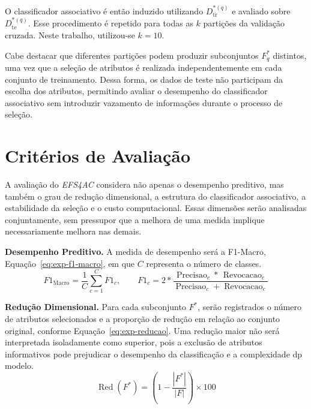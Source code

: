O classificador associativo é então induzido utilizando
$D_{\mathrm{tr}}^{*(q)}$ e avaliado sobre
$D_{\mathrm{te}}^{*(q)}$. Esse procedimento é repetido para
todas as $k$ partições da validação cruzada. Neste trabalho, utilizou-se $k=10$.

Cabe destacar que diferentes partições podem produzir subconjuntos
$F_q^{*}$ distintos, uma vez que a seleção de atributos é realizada
independentemente em cada conjunto de treinamento. Dessa forma,
os dados de teste não participam da escolha dos atributos, permitindo
avaliar o desempenho do classificador associativo sem introduzir
vazamento de informações durante o processo de seleção.

\section{Critérios de Avaliação}
\label{sec:exp-criterios}

A avaliação do \textit{EFS4AC} considera não apenas o desempenho preditivo,
mas também o grau de redução dimensional, a estrutura do classificador
associativo, a estabilidade da seleção e o custo computacional. Essas dimensões
serão analisadas conjuntamente, sem pressupor que a melhora de uma medida
implique necessariamente melhora nas demais.

\textbf{Desempenho Preditivo.} A medida de desempenho será a F1-Macro, Equação~\ref{eq:exp-f1-macro}, em que $C$ representa o número de classes.
\begin{equation}\label{eq:exp-f1-macro}
    F1_{\mathrm{Macro}}=\frac{1}{C}\sum_{c=1}^{C}F1_c,
    \qquad
    F1_c=2*\frac{\operatorname{Precisao}_c*\,\operatorname{Revocacao}_c}
    {\operatorname{Precisao}_c+\operatorname{Revocacao}_c}
\end{equation}

\textbf{Redução Dimensional.} Para cada subconjunto $F^{*}$, serão registrados o número de atributos selecionados e a proporção de redução em relação ao conjunto original, conforme Equação~\ref{eq:exp-reducao}. Uma redução maior não será interpretada isoladamente como superior,
pois a exclusão de atributos informativos pode prejudicar o desempenho da classificação e a complexidade dp modelo.
\begin{equation}\label{eq:exp-reducao}
    \operatorname{Red}(F^{*})=
    \left(1-\frac{|F^{*}|}{|F|}\right)\times 100
\end{equation}

